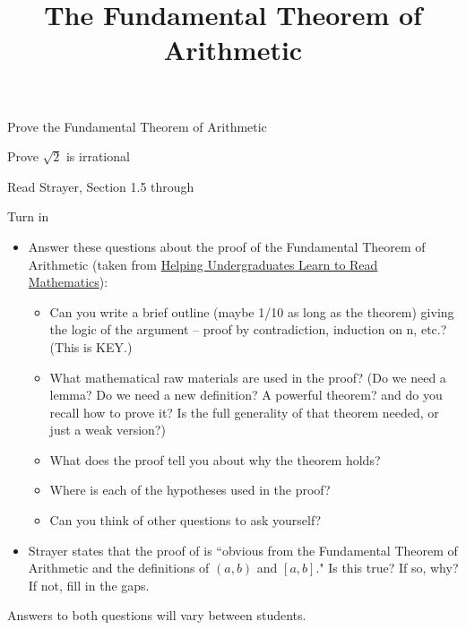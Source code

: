 \documentclass{ximera}
\title{The Fundamental Theorem of Arithmetic}
\begin{document}
\begin{abstract}
\end{abstract}
\maketitle


\begin{obj}
\item Prove the Fundamental Theorem of Arithmetic
\item  Prove $\sqrt{2}$ is irrational
\end{obj}

\begin{instructorNotes}
	\begin{pre}
		\item[Read] Strayer, Section 1.5 through 
		\item[Turn in] 
		\begin{itemize}
		   \item Answer these questions about the proof of the Fundamental Theorem of Arithmetic (taken from \href{https://maa.org/node/121566}{Helping Undergraduates Learn to Read Mathematics}):
		   
		   \begin{itemize}
			   \item Can you write a brief outline (maybe 1/10 as long as the theorem) giving the logic of the argument -- proof by contradiction, induction on n, etc.? (This is KEY.)
			   \item What mathematical raw materials are used in the proof? (Do we need a lemma? Do we need a new definition? A powerful theorem? and do you recall how to prove it? Is the full generality of that theorem needed, or just a weak version?)
			   \item What does the proof tell you about why the theorem holds?
			   \item Where is each of the hypotheses used in the proof?
			   \item Can you think of other questions to ask yourself?
		   \end{itemize}
	   
	   \item Strayer states that the proof of  is ``obvious from the Fundamental Theorem of Arithmetic and the definitions of $(a,b)$ and $[a,b]$." Is this true? If so, why? If not, fill in the gaps.
		\end{itemize}
	   
		
	   \begin{solution}
	   Answers to both questions will vary between students.
	   \end{solution}
	   \end{pre}
\end{instructorNotes}
\end{document}
